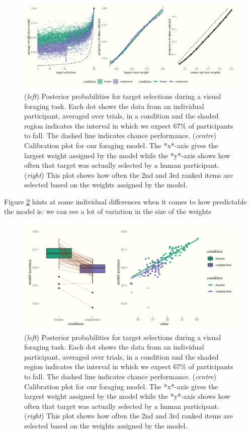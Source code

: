 \documentclass[vision,article,submit,pdftex,moreauthors]{Definitions/mdpi}
\begin{document}
\begin{figure}[H]
\centering
\includegraphics[width=12 cm]{Figures/qjep_preds.pdf}
\caption{(\textit{left}) Posterior probabilities for target selections during a visual foraging task. Each dot shows the  data from an individual participant, averaged over trials, in a condition and the shaded region indicates the interval in which we expect 67\% of participants to fall. The dashed line indicates chance performance. (\textit{centre})  Calibration plot for our foraging model. The *x*-axis gives the largest weight assigned by the model while the *y*-axis shows how often that target was actually selected by a human participant. (\textit{right}) This plot shows how often the 2nd and 3rd ranked items are selected based on the weights assigned by the model.}
\label{fig:cal}
\end{figure}   

Figure \ref{fig:cal} hints at some individual differences when it comes to how predictable the model is: we can see a lot of variation in the size of the weights 

\begin{figure}[H]
\centering
\includegraphics[width=12 cm]{Figures/qjep_indiv_diff.pdf}
\caption{(\textit{left}) Posterior probabilities for target selections during a visual foraging task. Each dot shows the  data from an individual participant, averaged over trials, in a condition and the shaded region indicates the interval in which we expect 67\% of participants to fall. The dashed line indicates chance performance. (\textit{centre})  Calibration plot for our foraging model. The *x*-axis gives the largest weight assigned by the model while the *y*-axis shows how often that target was actually selected by a human participant. (\textit{right}) This plot shows how often the 2nd and 3rd ranked items are selected based on the weights assigned by the model.}
\label{fig:cal}
\end{figure}   
\end{document}
